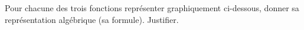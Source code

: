 \documentclass[exercice]{thedocument}%
\begin{document}
%
Pour chacune des trois fonctions représenter graphiquement ci-dessous, donner
sa représentation algébrique (sa formule). Justifier.\par\vskip10pt
\end{document}
